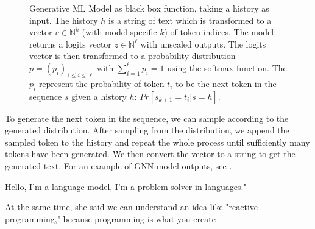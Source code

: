 \begin{figure}[htpb]
	\centering
	\caption{
Generative ML Model as black box function, taking a history as input.
The history $h$ is a string of text which is transformed to a vector $v \in \mathbb{N}^k$ (with model-specific $k$) of token indices.
The model returns a logits vector $z \in \mathbb{N}^{\ell}$ with unscaled outputs.
The logits vector is then transformed to a probability distribution $p = \left(p_i\right)_{1 \leq i \leq \ell}$ with $\sum_{i=1}^{\ell} p_i = 1$ using the softmax function.
	The $p_i$ represent the probability of token $t_i$ to be the next token in the sequence $s$ given a history $h$: $Pr[s_{k+1}=t_i|s=h]$.
}
	\label{fig:generative-network}
\end{figure}

To generate the next token in the sequence, we can sample according to the generated distribution.
After sampling from the distribution, we append the sampled token to the history and repeat the whole process until sufficiently many tokens have been generated.
We then convert the vector to a string to get the generated text.
For an example of GNN model outputs, see .

\begin{example}
	Hello, I'm a language model, I'm a problem solver in languages."

	At the same time, she said we can understand an idea like "reactive programming," because programming is what you create
	\label{example:gpt2-output-sample}
\end{example}

